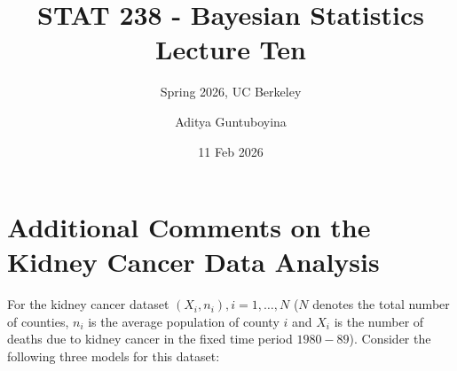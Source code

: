 \documentclass{scrartcl}
\begin{document}
\title{STAT 238 - Bayesian Statistics  \\
  Lecture Ten} 
\subtitle{Spring 2026, UC Berkeley}

\author{Aditya Guntuboyina}


\date{11 Feb 2026}

\maketitle

\section{Additional Comments on the Kidney Cancer Data Analysis}
For the kidney cancer dataset $(X_i, n_i), i = 1, \dots, N$ ($N$
denotes the total number of counties, $n_i$ is the average population
of county $i$ and $X_i$ is the number of deaths due to kidney cancer
in the fixed time period $1980-89$). Consider the following three
models for this dataset:
\end{document}
